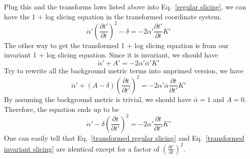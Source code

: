 \documentclass{article}
\begin{document}
Plug this and the transforms laws listed above into Eq.~\ref{regular slicing}, we can have the 1 + log slicing equation in the transformed coordinate system. 
\begin{equation}\label{transformed regular slicing}
{\dot \alpha}'\left(\frac{\partial t'}{\partial t}\right)^{2} - \delta = - 2 \alpha' \frac{\partial t'}{\partial t}K'
\end{equation}
The other way to get the transformed 1 + log slicing equation is from our invariant 1 + log slicing equation. Since it is invariant, we should have
\[
{\dot \alpha}' + A' = - 2\alpha'{\bar \alpha}'K'
\]
Try to rewrite all the background metric terms into unprimed version, we have
\[
{\dot \alpha}' + (A - \delta)\left(\frac{\partial t}{\partial t'}\right)^{2} = -2\alpha' {\bar \alpha}\frac{\partial t}{\partial t'}K'
\]
By assuming the background metric is trivial, we should have ${\bar \alpha} = 1$ and $A = 0$. Therefore, the equation ends up to be
\begin{equation}\label{transformed invariant slicing}
{\dot \alpha}'  - \delta\left(\frac{\partial t}{\partial t'}\right)^{2} = -2\alpha'\frac{\partial t}{\partial t'}K'
\end{equation}
One can easily tell that Eq.~\ref{transformed regular slicing} and Eq.~\ref{transformed invariant slicing} are identical except for a factor of $\left(\frac{\partial t'}{\partial t}\right)^{2}$.
\end{document}
